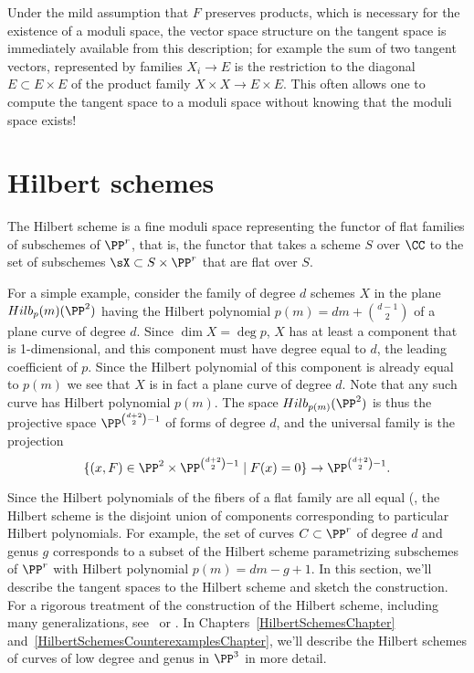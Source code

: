 Under the mild
 assumption that $F$ preserves products, which is necessary for the existence of a moduli space, 
 the vector space structure on the tangent space is immediately available from this description; for example the
 sum of two tangent vectors, represented by families $X_i \to E$ is the restriction to the diagonal
 $E \subset E\times E$
 of the product family $X \times X \to E\times E$.
This often allows one to compute the tangent space to a moduli space without knowing that the moduli space exists!


\section{Hilbert schemes}\label{hilbert scheme section}

The Hilbert scheme is a fine moduli space representing the functor of flat families of subschemes of $\PP^r$,
that is, the functor that takes a scheme $S$ over $\CC$ to the set of subschemes $\sX \subset S\times \PP^r$
that are flat over $S$. 

\begin{example}
 For a simple example, consider the family of degree $d$ schemes $X$ in the plane
$Hilb_p(m)(\PP^2)$
having the Hilbert polynomial $p(m) = dm+{d-1\choose 2}$ of a plane curve of degree $d$. Since 
$\dim X = \deg p$, $X$ has at least a component that is 1-dimensional, and this component must have degree
equal to $d$, the leading coefficient of $p$. Since the Hilbert polynomial  of this component is already equal
to $p(m)$ we see that $X$ is in fact a plane curve of degree $d$. Note that any such curve has Hilbert polynomial 
$p(m)$. The space $Hilb_{p(m)}(\PP^2)$ is thus the projective space $\PP^{{d+2\choose 2}-1}$ of forms of degree $d$,
and the universal family is the projection 
$$
\{(x,F) \in \PP^2 \times \PP^{{d+2\choose 2}-1} \mid F(x) = 0\} \to \PP^{{d+2\choose 2}-1}.
$$
\end{example}
 
Since the Hilbert polynomials of the fibers of a flat family are all equal (\cite[Section III.9]{Hartshorne1977}, the Hilbert scheme is the disjoint union of components corresponding to particular Hilbert polynomials. For example, the set of curves $C \subset \PP^r$ of degree $d$ and genus $g$ corresponds to a subset of the Hilbert scheme parametrizing subschemes of $\PP^r$ with Hilbert polynomial $p(m) = dm - g + 1$. In this section, we'll describe
 the tangent spaces to the Hilbert scheme and sketch the construction. For a rigorous treatment of the construction of the Hilbert scheme, including many generalizations,  see~\cite{HomogHilbert} or \cite{MR2222646}. In Chapters~\ref{HilbertSchemesChapter} and~\ref{HilbertSchemesCounterexamplesChapter}, we'll describe  the Hilbert schemes of curves of low degree and genus in $\PP^3$ in more detail. 

